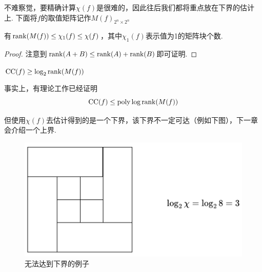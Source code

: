 不难察觉，要精确计算$\chi(f)$是很难的，因此往后我们都将重点放在下界的估计上. 下面将$f$的取值矩阵记作$M(f)_{2^n \times 2^n}$ 

\begin{theorem}
    有$\operatorname*{rank}(M(f)) \le \chi_1(f) \le \chi(f)$，其中$\chi_1(f)$表示值为1的矩阵块个数. 
\end{theorem}
\begin{proof}
    注意到$\operatorname*{rank}(A+B) \le \operatorname*{rank}(A) + \operatorname*{rank}(B)$即可证明. 
\end{proof}
\begin{corollary}
    $\operatorname*{CC}(f) \ge \log_2 \operatorname*{rank}(M(f))$
\end{corollary}

事实上，有理论工作已经证明 
\[
\operatorname*{CC}(f) \le \text{poly} \log \operatorname*{rank}(M(f))
\]

但使用$\chi(f)$去估计得到的是一个下界，该下界不一定可达（例如下图），下一章会介绍一个上界. 


\begin{figure}[H]
    \centering
    \includegraphics[width=.7\textwidth]{images/c14_1.png}
    \caption{无法达到下界的例子}
\end{figure}